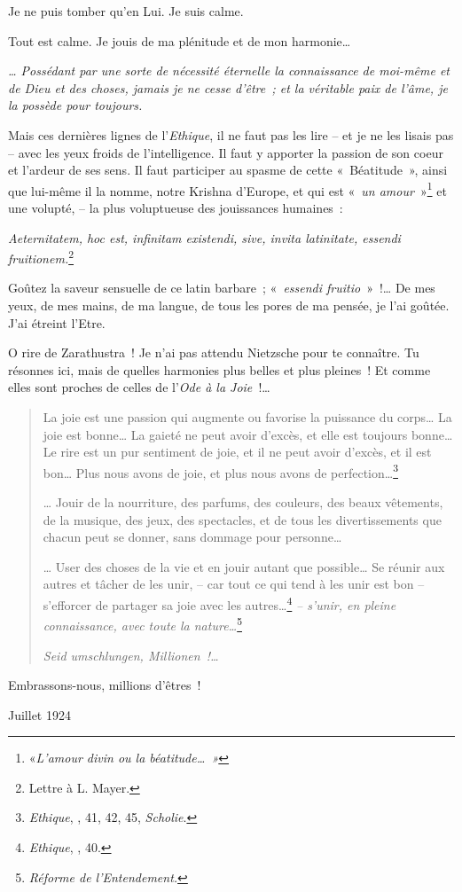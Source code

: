 Je ne puis tomber qu'en Lui. Je suis calme.

Tout est calme. Je jouis de ma plénitude et de mon harmonie\ldots{}

\emph{\ldots{} Possédant par une sorte de nécessité éternelle la connaissance
de moi-même et de Dieu et des choses, jamais je ne cesse d'être~; et la
véritable paix de l'âme, je la possède pour toujours.}

Mais ces dernières lignes de l'\emph{Ethique}, il ne faut pas les lire
-- et je ne les lisais pas -- avec les yeux froids de l'intelligence. Il
faut y apporter la passion de son coeur et l'ardeur de ses sens. Il faut
participer au spasme de cette «~Béatitude~», ainsi que lui-même il la
nomme, notre Krishna d'Europe, et qui est «~\emph{un amour}~»\footnote{«\emph{L'amour
  divin ou la béatitude\ldots{}~»}} et une volupté, -- la plus voluptueuse
des jouissances humaines~:

\emph{Aeternitatem, hoc est, infinitam existendi, sive, invita
latinitate, essendi fruitionem.}\footnote{Lettre  à L. Mayer.}

Goûtez la saveur sensuelle de ce latin barbare~; «~\emph{essendi
fruitio}~»~!\ldots{} De mes yeux, de mes mains, de ma langue, de tous les
pores de ma pensée, je l'ai goûtée. J'ai étreint l'Etre.

O rire de Zarathustra~! Je n'ai pas attendu Nietzsche pour te connaître.
Tu résonnes ici, mais de quelles harmonies plus belles et plus pleines~!
Et comme elles sont proches de celles de l'\emph{Ode à la Joie~}!\ldots{}

\begin{quote}
La joie est une passion qui augmente ou favorise la puissance du
corps\ldots{} La joie est bonne\ldots{} La gaieté ne peut avoir d'excès, et elle
est toujours bonne\ldots{} Le rire est un pur sentiment de joie, et il ne
peut avoir d'excès, et il est bon\ldots{} Plus nous avons de joie, et plus
nous avons de perfection\ldots{}\footnote{\emph{Ethique}, , 41, 42, 45,
  \emph{Scholie}.}

\ldots{} Jouir de la nourriture, des parfums, des couleurs, des beaux
vêtements, de la musique, des jeux, des spectacles, et de tous les
divertissements que chacun peut se donner, sans dommage pour
personne\ldots{}

\ldots{} User des choses de la vie et en jouir autant que possible\ldots{}
Se réunir aux autres et tâcher de les unir, -- car tout ce qui
tend à les unir est bon -- s'efforcer de partager sa joie avec les
autres\ldots{}\footnote{\emph{Ethique}, , 40.} \emph{-- s'unir, en pleine
connaissance, avec toute la nature\ldots{}}\footnote{\emph{Réforme de
  l'Entendement.}}

\emph{Seid umschlungen, Millionen~!\ldots{}}
\end{quote}

Embrassons-nous, millions d'êtres~!

\begin{flushright}
Juillet 1924
\end{flushright}